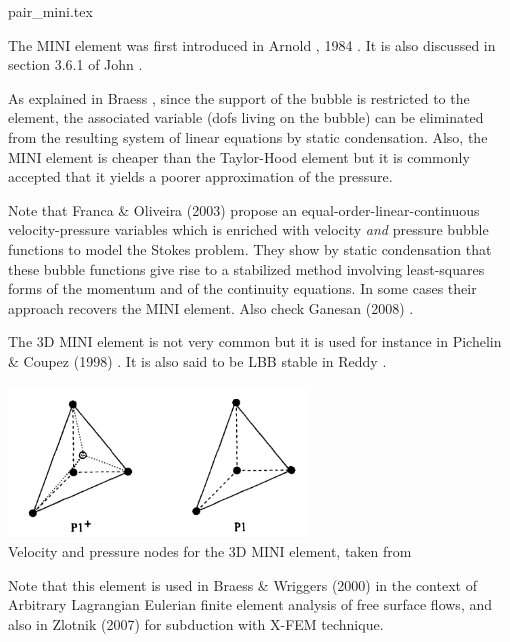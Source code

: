 \begin{flushright} {\tiny {\color{gray} pair\_mini.tex}} \end{flushright}

\noindent
\begin{minipage}{0.48\textwidth}
The  MINI element was first introduced in Arnold \etal, 1984 \cite{arbf84}.
It is also discussed in section 3.6.1 of John \cite{john16}.


As explained in Braess \cite{braess}, since the support of the bubble is restricted to the element, 
the associated variable (dofs living on the bubble) can be eliminated from the resulting 
system of linear equations by static condensation. 
Also, the MINI element is cheaper than the Taylor-Hood element but it is commonly accepted
that it yields a poorer approximation of the pressure.
\end{minipage}\hfill
\begin{minipage}{0.48\textwidth}

\end{minipage}

\begin{remark}
Note that Franca \& Oliveira (2003) \cite{frol03} propose an equal-order-linear-continuous 
velocity-pressure variables which is enriched 
with velocity {\it and} pressure bubble functions to model the Stokes problem. 
They show by static condensation that
these bubble functions give rise to a stabilized method involving least-squares forms of 
the momentum and of the
continuity equations. In some cases their approach recovers 
the MINI element. Also check Ganesan \etal (2008) \cite{gamt08}.
\end{remark}


The 3D MINI element is not very common but it is used for instance in Pichelin \& Coupez (1998) 
\cite{pico98}. It is also said to be LBB stable in Reddy \cite[p180]{reddybook2}.

\begin{center}
\includegraphics[width=8cm]{images/mini/mini3D}\\
{\captionfont Velocity and pressure nodes for the 3D MINI element, taken from \cite{pico98}}
\end{center}

Note that this element is used in Braess \& Wriggers (2000) \cite{brwr00} 
in the context of Arbitrary Lagrangian Eulerian 
finite element analysis of free surface flows, and also 
in Zlotnik \etal (2007) \cite{zldf07} for subduction with X-FEM technique. 
